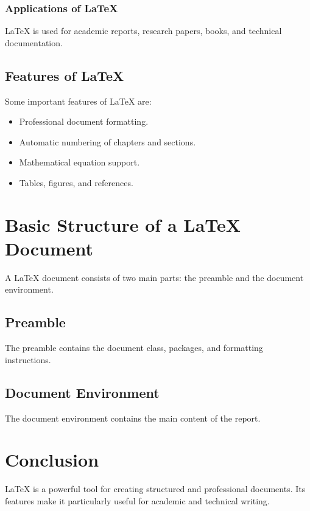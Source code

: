 \documentclass[12pt,a4paper]{report}
\begin{document}
\subsection{Applications of LaTeX}

LaTeX is used for academic reports, research papers,
books, and technical documentation.

\section{Features of LaTeX}

Some important features of LaTeX are:

\begin{itemize}
    \item Professional document formatting.
    \item Automatic numbering of chapters and sections.
    \item Mathematical equation support.
    \item Tables, figures, and references.
\end{itemize}

\chapter{Basic Structure of a LaTeX Document}

A LaTeX document consists of two main parts:
the preamble and the document environment.

\section{Preamble}

The preamble contains the document class,
packages, and formatting instructions.

\section{Document Environment}

The document environment contains the main
content of the report.

\chapter{Conclusion}

LaTeX is a powerful tool for creating structured
and professional documents. Its features make it
particularly useful for academic and technical writing.
\end{document}
